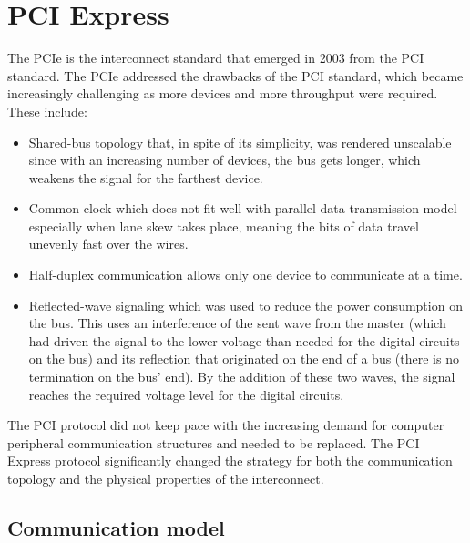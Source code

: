 \chapter{PCI Express}
\label{chap:pcie_express}

The \ac{PCIe} is the interconnect standard that emerged in 2003 from the \ac{PCI} standard. The
\ac{PCIe} addressed the drawbacks of the \ac{PCI} standard, which became increasingly challenging as more
devices and more throughput were required. These include:

\begin{itemize}
        \item Shared-bus topology that, in spite of its simplicity, was rendered unscalable since
        with an increasing number of devices, the bus gets longer, which weakens the signal for the
        farthest device.
        \item Common clock which does not fit well with parallel data transmission model especially
        when lane skew takes place, meaning the bits of data travel unevenly fast over the wires.
        \item Half-duplex communication allows only one device to communicate at a
        time.
        \item Reflected-wave signaling which was used to reduce the power consumption on the bus.
        This uses an interference of the sent wave from the master (which had driven the signal to
        the lower voltage than needed for the digital circuits on the bus) and its reflection that
        originated on the end of a bus (there is no termination on the bus' end). By the addition of
        these two waves, the signal reaches the required voltage level for the digital
        circuits\cite{pcie_book}.
\end{itemize}

The PCI protocol did not keep pace with the increasing demand for computer peripheral communication
structures and needed to be replaced. The PCI Express protocol significantly changed the strategy
for both the communication topology and the physical properties of the interconnect\cite{pcie_book}.

\section{Communication model}


